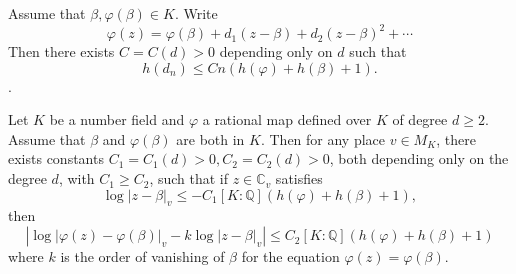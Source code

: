 \documentclass[10pt,a4paper]{amsart}
\newcommand{\bb}{\mathbb}
\newcommand{\vphi}{\varphi}
\begin{document}
\begin{proposition} \label{DerivativeBound1}
 Assume that $\beta,\vphi(\beta) \in K$. Write 
 $$\vphi(z) = \vphi(\beta) + d_1 (z-\beta) + d_2 (z-\beta)^2 + \cdots$$
 Then there exists $C = C(d) > 0$ depending only on $d$ such that  
$$h(d_n) \leq Cn(h(\vphi) + h(\beta)+1).$$. 
\end{proposition}

\begin{proposition} \label{DerivativeBound2}
Let $K$ be a number field and $\vphi$ a rational map defined over $K$ of degree $d \geq 2$. Assume that $\beta$ and $\vphi(\beta)$ are both in $K$. Then for any place $v \in M_K$, there exists constants $C_1 = C_1 (d) > 0, C_2 = C_2(d) > 0$, both depending only on the degree $d$, with $C_1 \geq C_2$, such that if $z \in \bb{C}_v$ satisfies 
\begin{equation} \label{eq: SuperAttracting2}
\log |z-\beta|_v \leq -C_1[K:\bb{Q}](h(\vphi) + h(\beta)+1),
\end{equation}
then
$$\left| \log |\vphi(z)-\vphi(\beta)|_v - k \log |z-\beta|_v \right| \leq C_2 [K:\bb{Q}](h(\vphi) + h(\beta) + 1)$$
where $k$ is the order of vanishing of $\beta$ for the equation $\vphi(z) = \vphi(\beta)$. 
\end{proposition}
\end{document}
